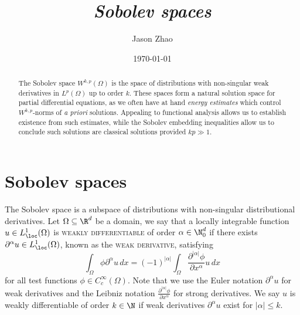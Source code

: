 \documentclass[reqno]{amsart}
\title
{
	\emph{Sobolev spaces}
}
\author{Jason Zhao}
\date{\today}
\theoremstyle{definition}
\theoremstyle{remark}
\renewcommand{\emph}{\textsc}
\begin{document}
\maketitle

\begin{abstract}
	The Sobolev space $W^{k, p} (\Omega)$ is the space of distributions with non-singular weak derivatives in $L^p (\Omega)$ up to order $k$. These spaces form a natural solution space for partial differential equations, as we often have at hand \textit{energy estimates} which control $W^{k, p}$-norms of \textit{a priori} solutions. Appealing to functional analysis allows us to establish existence from such estimates, while the Sobolev embedding inequalities allow us to conclude such solutions are classical solutions provided $kp \gg 1$. 
\end{abstract}

\tableofcontents
	

\section{Sobolev spaces}

The Sobolev space is a subspace of distributions with non-singular distributional derivatives. Let $\Omega \subseteq \R^d$ be a domain, we say that a locally integrable function $u \in L^1_\loc (\Omega)$ is \emph{weakly differentiable} of order $\alpha \in \N_0^d$ if there exists $\partial^\alpha u \in L^1_\loc (\Omega)$, known as the \emph{weak derivative}, satisfying
	\[ \int_\Omega \phi \partial^\alpha u \, dx = (-1)^{|\alpha|}\int_\Omega \frac{\partial^{|\alpha|} \phi}{\partial x^\alpha} u \, dx  \]
for all test functions $\phi \in C^\infty_c (\Omega)$. Note that we use the Euler notation $\partial^\alpha u$ for weak derivatives and the Leibniz notation $\tfrac{\partial^{|\alpha|}\phi}{\partial x^\alpha}$ for strong derivatives. We say $u$ is weakly differentiable of order $k \in \N$ if weak derivatives $\partial^\alpha u$ exist for $|\alpha| \leq k$. 
\end{document}
